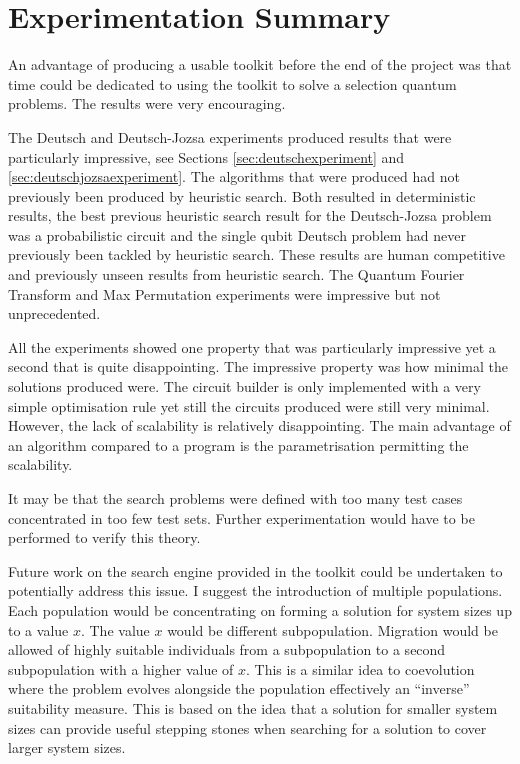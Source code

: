 \section{Experimentation Summary}

An advantage of producing a usable toolkit before the end of the project was that time could be dedicated to using the toolkit to solve a selection quantum problems.
The results were very encouraging.

The Deutsch and Deutsch-Jozsa experiments produced results that were particularly impressive, see Sections \ref{sec:deutschexperiment} and \ref{sec:deutschjozsaexperiment}.
The algorithms that were produced had not previously been produced by heuristic search.
Both resulted in deterministic results, the best previous heuristic search result for the Deutsch-Jozsa problem was a probabilistic circuit and the single qubit Deutsch problem had never previously been tackled by heuristic search.
These results are human competitive and previously unseen results from heuristic search.
The Quantum Fourier Transform and Max Permutation experiments were impressive but not unprecedented.

All the experiments showed one property that was particularly impressive yet a second that is quite disappointing.
The impressive property was how minimal the solutions produced were.
The circuit builder is only implemented with a very simple optimisation rule yet still the circuits produced were still very minimal.
However, the lack of scalability is relatively disappointing.
The main advantage of an algorithm compared to a program is the parametrisation permitting the scalability.

It may be that the search problems were defined with too many test cases concentrated in too few test sets.
Further experimentation would have to be performed to verify this theory.

Future work on the search engine provided in the toolkit could be undertaken to potentially address this issue.
I suggest the introduction of multiple populations.
Each population would be concentrating on forming a solution for system sizes up to a value $x$.
The value $x$ would be different subpopulation.
Migration would be allowed of highly suitable individuals from a subpopulation to a second subpopulation with a higher value of $x$.
This is a similar idea to coevolution where the problem evolves alongside the population effectively an ``inverse'' suitability measure.
This is based on the idea that a solution for smaller system sizes can provide useful stepping stones when searching for a solution to cover larger system sizes.

